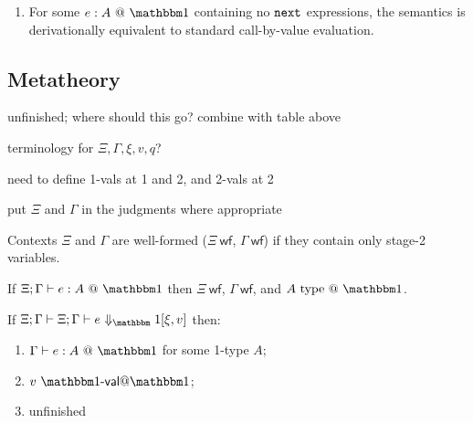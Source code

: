 \begin{enumerate}
\item For some $\colone{e}{A}$ containing no ${\tt next}$ expressions, the semantics is derivationally equivalent to standard call-by-value evaluation.
\end{enumerate}

\subsection{Metatheory}

\TODO unfinished; where should this go? combine with table above

\noindent\TODO terminology for $\Xi,\Gamma,\xi,v,q$?

\noindent\TODO need to define 1-vals at 1 and 2, and 2-vals at 2

\noindent\TODO put $\Xi$ and $\Gamma$ in the judgments where appropriate

\newcommand{\wf}{\ \mathsf{wf}}
\newcommand{\dom}[1]{\mathsf{dom}(#1)}
\newcommand{\valoo}{\ \bbone\textsf{-}\mathsf{val} @ \bbone}
\newcommand{\valot}{\ \bbone\textsf{-}\mathsf{val} @ \bbtwo}
\newcommand{\valtt}{\ \bbtwo\textsf{-}\mathsf{val} @ \bbtwo}

\begin{definition}
Contexts $\Xi$ and $\Gamma$ are well-formed ($\Xi\wf$, $\Gamma\wf$) if they
contain only stage-2 variables.
\end{definition}

\begin{theorem}
If $\Xi;\typesone e A$ then $\Xi\wf$, $\Gamma\wf$, and $A\istypeone$.
\end{theorem}

\begin{theorem}
If $\Xi;\Gamma\vdash\diaonesub$ then:
\begin{enumerate}
\item $\typesone e A$ for some 1-type $A$;
\item $v\valoo$;
\item \TODO unfinished
\end{enumerate}
\end{theorem}




